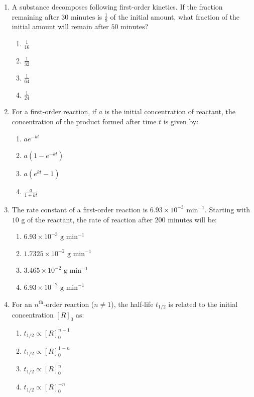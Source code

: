 \documentclass[11pt, a4paper]{article}
\begin{document}
\begin{enumerate}
\item A substance decomposes following first-order kinetics. If the fraction remaining after $30\text{ minutes}$ is $\frac{1}{8}$ of the initial amount, what fraction of the initial amount will remain after $50\text{ minutes}$?
\begin{enumerate}
    \item $\frac{1}{16}$
    \item $\frac{1}{32}$
    \item $\frac{1}{64}$
    \item $\frac{1}{24}$
\end{enumerate}

\item For a first-order reaction, if $a$ is the initial concentration of reactant, the concentration of the product formed after time $t$ is given by:
\begin{enumerate}
    \item $a e^{-kt}$
    \item $a(1 - e^{-kt})$
    \item $a(e^{kt} - 1)$
    \item $\frac{a}{1 + kt}$
\end{enumerate}

\item The rate constant of a first-order reaction is $6.93 \times 10^{-3}\text{ min}^{-1}$. Starting with $10\text{ g}$ of the reactant, the rate of reaction after $200\text{ minutes}$ will be:
\begin{enumerate}
    \item $6.93 \times 10^{-3}\text{ g min}^{-1}$
    \item $1.7325 \times 10^{-2}\text{ g min}^{-1}$
    \item $3.465 \times 10^{-2}\text{ g min}^{-1}$
    \item $6.93 \times 10^{-2}\text{ g min}^{-1}$
\end{enumerate}

\item For an $n^{\text{th}}$-order reaction ($n \neq 1$), the half-life $t_{1/2}$ is related to the initial concentration $[R]_0$ as:
\begin{enumerate}
    \item $t_{1/2} \propto [R]_0^{n-1}$
    \item $t_{1/2} \propto [R]_0^{1-n}$
    \item $t_{1/2} \propto [R]_0^n$
    \item $t_{1/2} \propto [R]_0^{-n}$
\end{enumerate}


\end{enumerate}
\end{document}
